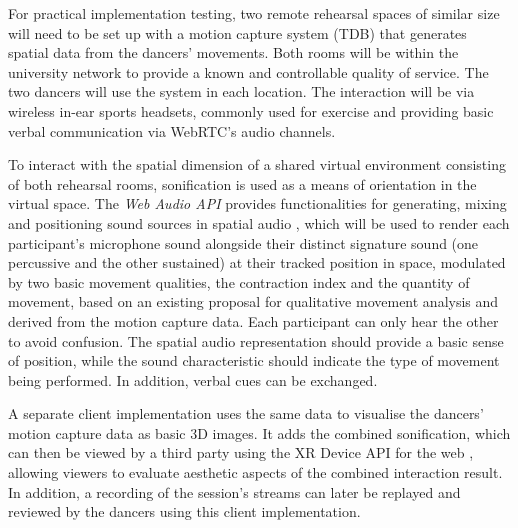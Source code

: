 For practical implementation testing, two remote rehearsal spaces of similar size will need to be set up with a motion capture system (TDB) that generates spatial data from the dancers' movements. Both rooms will be within the university network to provide a known and controllable quality of service. The two dancers will use the system in each location. The interaction will be via wireless in-ear sports headsets, commonly used for exercise and providing basic verbal communication via \ac{WebRTC}'s audio channels.

To interact with the spatial dimension of a shared virtual environment consisting of both rehearsal rooms, sonification is used as a means of orientation in the virtual space. The \emph{Web Audio \ac{API}} provides functionalities for generating, mixing and positioning sound sources in spatial audio \parencite{webAudioSpec}, which will be used to render each participant's microphone sound alongside their distinct signature sound (one percussive and the other sustained) at their tracked position in space, modulated by two basic movement qualities, the contraction index and the quantity of movement, based on an existing proposal for qualitative movement analysis \parencite{movementQualities} and derived from the motion capture data. Each participant can only hear the other to avoid confusion. The spatial audio representation should provide a basic sense of position, while the sound characteristic should indicate the type of movement being performed. In addition, verbal cues can be exchanged.

A separate client implementation uses the same data to visualise the dancers' motion capture data as basic \ac{3D} images. It adds the combined sonification, which can then be viewed by a third party using the \ac{XR} Device \ac{API} for the web \parencite{webXrSpec}, allowing viewers to evaluate aesthetic aspects of the combined interaction result. In addition, a recording of the session's streams can later be replayed and reviewed by the dancers using this client implementation.
